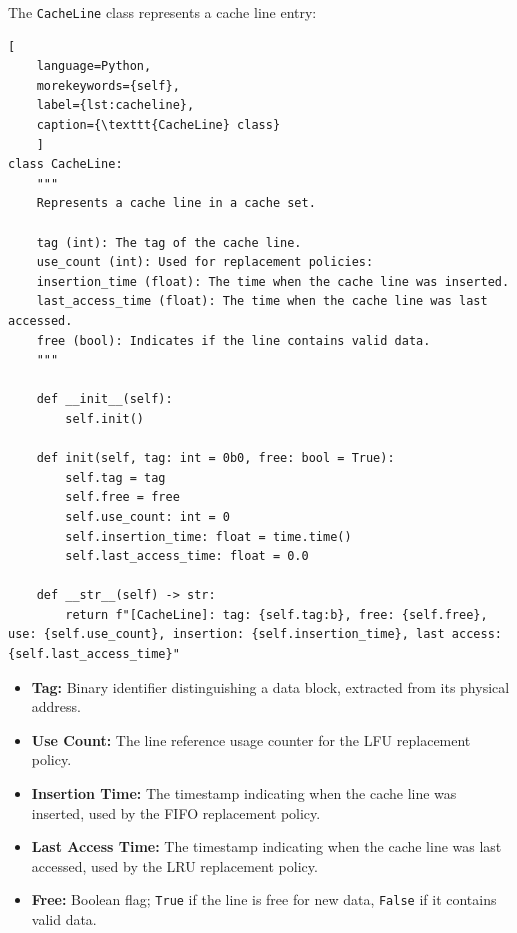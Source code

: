 The \texttt{CacheLine} class represents a cache line entry:

\begin{center}
\centering
\begin{minipage}{\linewidth}
\begin{lstlisting}[
    language=Python,
	morekeywords={self},
    label={lst:cacheline},
    caption={\texttt{CacheLine} class}
    ]
class CacheLine:
    """
    Represents a cache line in a cache set.

    tag (int): The tag of the cache line.
    use_count (int): Used for replacement policies:
    insertion_time (float): The time when the cache line was inserted.
    last_access_time (float): The time when the cache line was last accessed.
    free (bool): Indicates if the line contains valid data.
    """

    def __init__(self):
        self.init()

    def init(self, tag: int = 0b0, free: bool = True):
        self.tag = tag
        self.free = free
        self.use_count: int = 0
        self.insertion_time: float = time.time()
        self.last_access_time: float = 0.0

    def __str__(self) -> str:
        return f"[CacheLine]: tag: {self.tag:b}, free: {self.free}, use: {self.use_count}, insertion: {self.insertion_time}, last access: {self.last_access_time}"
\end{lstlisting}
\end{minipage}
\end{center}

\begin{itemize}
    \item \textbf{Tag:} Binary identifier distinguishing a data block, extracted from its physical address.
    \item \textbf{Use Count:} The line reference usage counter for the LFU replacement policy.
    \item \textbf{Insertion Time:} The timestamp indicating when the cache line was inserted, used by the FIFO replacement policy.
    \item \textbf{Last Access Time:} The timestamp indicating when the cache line was last accessed, used by the LRU replacement policy.
    \item \textbf{Free:} Boolean flag; \texttt{True} if the line is free for new data, \texttt{False} if it contains valid data.
\end{itemize}


